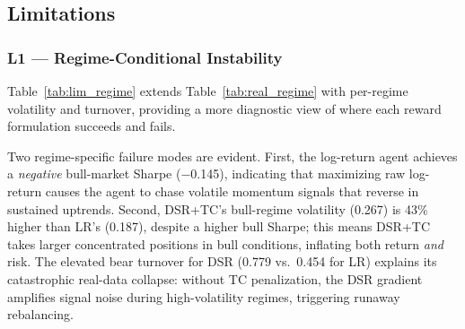 \documentclass[conference]{IEEEtran}
\begin{document}
\subsection{Limitations}
\label{subsec:limitations}

\subsubsection{L1 --- Regime-Conditional Instability}

Table~\ref{tab:lim_regime} extends Table~\ref{tab:real_regime} with
per-regime volatility and turnover, providing a more diagnostic view
of where each reward formulation succeeds and fails.

\begin{table}[t]
\caption{Regime-Conditional Diagnostics --- Real S\&P~500 (2022--2024)}
\label{tab:lim_regime}
\centering
{}
\end{table}

Two regime-specific failure modes are evident. First, the log-return
agent achieves a \emph{negative} bull-market Sharpe ($-$0.145),
indicating that maximizing raw log-return causes the agent to chase
volatile momentum signals that reverse in sustained uptrends. Second,
DSR+TC's bull-regime volatility (0.267) is 43\% higher than LR's
(0.187), despite a higher bull Sharpe; this means DSR+TC takes larger
concentrated positions in bull conditions, inflating both return
\emph{and} risk. The elevated bear turnover for DSR (0.779 vs.~0.454
for LR) explains its catastrophic real-data collapse: without TC
penalization, the DSR gradient amplifies signal noise during
high-volatility regimes, triggering runaway rebalancing.
\end{document}
